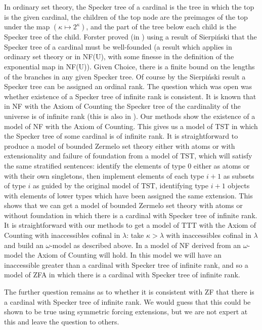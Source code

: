 \documentclass{article}
\theoremstyle{definition}
\theoremstyle{remark}
\begin{document}
{In ordinary set theory, the Specker tree of a cardinal is the tree in which the top is the given cardinal, the children of the top node  are the preimages of the top under the map $(\kappa \mapsto 2^{\kappa})$, and the part of the tree
below each child is the Specker tree of the child.  Forster proved (in \cite{forsterthesis}) using a result of Sierpi\'nski that the Specker tree of a cardinal must be well-founded (a result which applies in ordinary set theory or in NF(U), with some finesse in the definition of the exponential map in NF(U)).  Given Choice, there is a finite bound on the lengths of the branches in any given Specker tree.  Of course by the Sierpi\'nski result a Specker tree can be assigned an ordinal rank.  The question which was open
was whether existence of a Specker tree of infinite rank is consistent.  It is known that in NF with the Axiom of Counting the Specker tree of the cardinality of the universe is of infinite rank (this is also in \cite{forsterthesis}).   Our methods show the existence of a model of NF with the Axiom of Counting.  This gives us a model of TST in which the Specker tree of some cardinal is of infinite rank.  It is straightforward to produce a model of bounded Zermelo set theory either with atoms or with extensionality and failure of foundation from a model of TST, which will satisfy the same stratified sentences:  identify the elements of type 0 either as atoms or with their own singletons, then implement elements of each type $i+1$ as subsets of type $i$ as guided by the original model of TST, identifying type $i+1$ objects with elements of lower types which have been assigned the same extension.  This shows that we can get a model of bounded Zermelo set theory with atoms or without foundation in which there is a cardinal with Specker tree of infinite rank.  It is straightforward with our methods to get a model of TTT with the Axiom of Counting with inaccessibles cofinal in $\lambda$:  take $\kappa > \lambda$ with inaccessibles cofinal in $\lambda$ and build an $\omega$-model as described above.  In a model of NF derived from an $\omega$-model the Axiom of Counting will hold.  In this model we will have an inaccessible greater than a cardinal with Specker tree of infinite rank,
and so a model of ZFA in which there is a cardinal with Specker tree of infinite rank.

The further question remains as to whether it is consistent with ZF that there is a cardinal with Specker tree of infinite rank.  We would guess that this could be shown to be true using symmetric forcing extensions, but we are not expert at this and leave the question to others.

}
\end{document}
